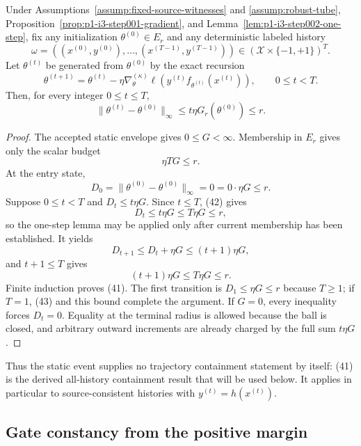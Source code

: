 \begin{proposition}
\label{prop:p1-i3-step002-closed-tube}
Under Assumptions~\ref{assump:fixed-source-witnesses} and
\ref{assump:robust-tube}, Proposition~\ref{prop:p1-i3-step001-gradient},
and Lemma~\ref{lem:p1-i3-step002-one-step}, fix any initialization
$\theta^{(0)}\in E_r$ and any deterministic labeled history
\[
\omega=((x^{(0)},y^{(0)}),\ldots,(x^{(T-1)},y^{(T-1)}))
\in(\mathcal X\times\{-1,+1\})^T.
\]
Let $\theta^{(t)}$ be generated from $\theta^{(0)}$ by the exact recursion
\[
\theta^{(t+1)}=\theta^{(t)}-\eta\nabla_\theta^{(\kappa)}
\ell\!\left(y^{(t)}f_{\theta^{(t)}}(x^{(t)})\right),
\qquad 0\leq t<T.
\]
Then, for every integer $0\leq t\leq T$,
\[
\|\theta^{(t)}-\theta^{(0)}\|_\infty
\leq t\eta G_r(\theta^{(0)})\leq r.
\tag{41}
\]
\end{proposition}

\begin{proof}
The accepted static envelope gives $0\leq G<\infty$.  Membership in $E_r$
gives only the scalar budget
\[
\eta T G\leq r.
\tag{42}
\]
At the entry state,
\[
D_0=\|\theta^{(0)}-\theta^{(0)}\|_\infty=0=0\cdot\eta G\leq r.
\tag{43}
\]
Suppose $0\leq t<T$ and $D_t\leq t\eta G$.  Since $t\leq T$, (42) gives
\[
D_t\leq t\eta G\leq T\eta G\leq r,
\tag{44}
\]
so the one-step lemma may be applied only after current membership has been
established.  It yields
\[
D_{t+1}\leq D_t+\eta G\leq(t+1)\eta G,
\tag{45}
\]
and $t+1\leq T$ gives
\[
(t+1)\eta G\leq T\eta G\leq r.
\tag{46}
\]
Finite induction proves (41).  The first transition is
$D_1\leq\eta G\leq r$ because $T\geq1$; if $T=1$, (43) and this bound
complete the argument.  If $G=0$, every inequality forces $D_t=0$.  Equality
at the terminal radius is allowed because the ball is closed, and arbitrary
outward increments are already charged by the full sum $t\eta G$.
\end{proof}

Thus the static event supplies no trajectory containment statement by itself:
(41) is the derived all-history containment result that will be used below.  It applies in
particular to source-consistent histories with $y^{(t)}=h(x^{(t)})$.

\subsection{Gate constancy from the positive margin}
\label{app:step003-gates}

